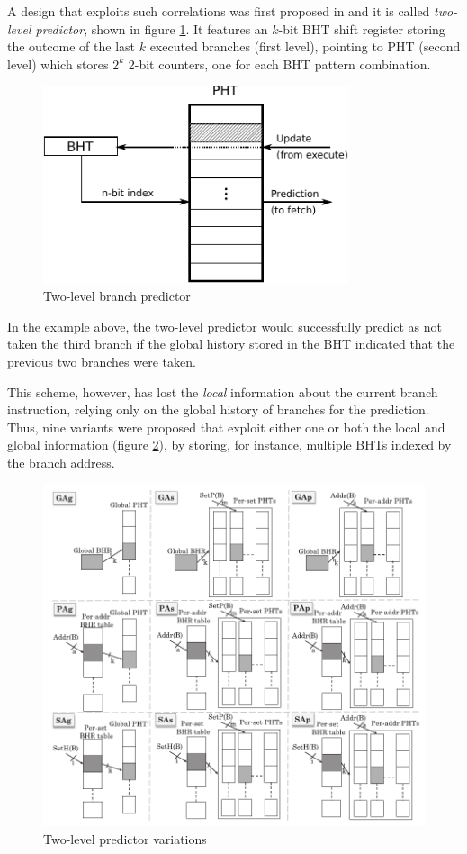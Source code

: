 A design that exploits such correlations was first proposed in \cite{yeh91} and it is called \emph{two-level predictor}, shown in figure \ref{fig:two-level-bp}. It features an $k$-bit \ac{BHT} shift register storing the outcome of the last $k$ executed branches (first level), pointing to \ac{PHT} (second level) which stores $2^k$ 2-bit counters, one for each \ac{BHT} pattern combination.
\begin{figure}[hbtp]
  \centering
  \includegraphics[width=0.8\textwidth]{img/two-level-bp.pdf}
  \caption{Two-level branch predictor}
  \label{fig:two-level-bp}
\end{figure}
In the example above, the two-level predictor would successfully predict as not taken the third branch if the global history stored in the \ac{BHT} indicated that the previous two branches were taken.

This scheme, however, has lost the \emph{local} information about the current branch instruction, relying only on the global history of branches for the prediction. Thus, nine variants were proposed \cite{yeh93} that exploit either one or both the local and global information (figure \ref{fig:yehvariations}), by storing, for instance, multiple \acp{BHT} indexed by the branch address.

\begin{figure}[hbtp]
  \centering
  \includegraphics[width=\textwidth]{img/yehvariations.pdf}
  \caption{Two-level predictor variations \cite{mittal19}}
  \label{fig:yehvariations}
\end{figure}

